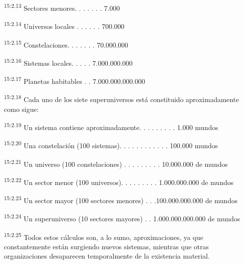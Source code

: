 \par
\textsuperscript{15:2.13} Sectores menores. . . . . . . 7.000

\par
\textsuperscript{15:2.14} Universos locales . . . . . . 700.000

\par
\textsuperscript{15:2.15} Constelaciones. . . . . . . 70.000.000

\par
\textsuperscript{15:2.16} Sistemas locales. . . . . 7.000.000.000

\par
\textsuperscript{15:2.17} Planetas habitables . . 7.000.000.000.000

\par
\textsuperscript{15:2.18} Cada uno de los siete superuniversos está constituido aproximadamente como sigue:

\par
\textsuperscript{15:2.19} Un sistema contiene aproximadamente. . . . . . . . . 1.000 mundos

\par
\textsuperscript{15:2.20} Una constelación (100 sistemas). . . . . . . . . . . . 100.000 mundos

\par
\textsuperscript{15:2.21} Un universo (100 constelaciones) . . . . . . . . . 10.000.000 de mundos

\par
\textsuperscript{15:2.22} Un sector menor (100 universos). . . . . . . . . 1.000.000.000 de mundos

\par
\textsuperscript{15:2.23} Un sector mayor (100 sectores menores) . . .100.000.000.000 de mundos

\par
\textsuperscript{15:2.24} Un superuniverso (10 sectores mayores) . . 1.000.000.000.000 de mundos

\par
\textsuperscript{15:2.25} Todos estos cálculos son, a lo sumo, aproximaciones, ya que constantemente están surgiendo nuevos sistemas, mientras que otras organizaciones desaparecen temporalmente de la existencia material.

